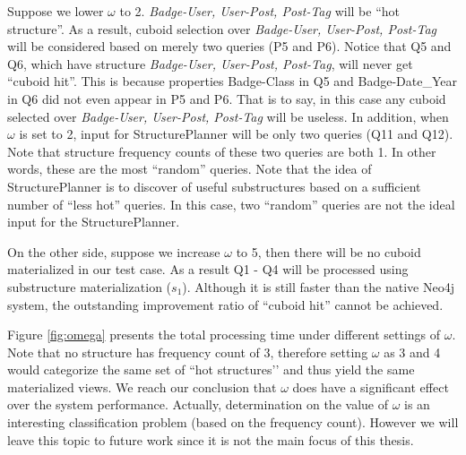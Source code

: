 	Suppose we lower $\omega$ to 2. \textit{Badge-User, User-Post, Post-Tag} will be ``hot structure''. As a result, cuboid selection over \textit{Badge-User, User-Post, Post-Tag} will be considered based on merely two queries (P5 and P6). Notice that Q5 and Q6, which have structure \textit{Badge-User, User-Post, Post-Tag}, will never get ``cuboid hit''. This is because properties Badge-Class in Q5 and Badge-Date\_Year in Q6 did not even appear in P5 and P6. That is to say, in this case any cuboid selected over \textit{Badge-User, User-Post, Post-Tag} will be useless. In addition, when $\omega$ is set to 2, input for StructurePlanner will be only two queries (Q11 and Q12). Note that structure frequency counts of these two queries are both 1. In other words, these are the most ``random'' queries. Note that the idea of StructurePlanner is to discover of useful substructures based on a sufficient number of ``less hot'' queries. In this case, two ``random'' queries are not the ideal input for the StructurePlanner.  
	
	On the other side, suppose we increase $\omega$ to 5, then there will be no cuboid materialized in our test case. As a result Q1 - Q4 will be processed using substructure materialization ($s_1$). Although it is still faster than the native Neo4j system, the outstanding improvement ratio of ``cuboid hit'' cannot be achieved. 
	
	Figure \ref{fig:omega} presents the total processing time under different settings of $\omega$. Note that no structure has frequency count of 3, therefore setting $\omega$ as 3 and 4 would categorize the same set of ``hot structures’’ and thus yield the same materialized views. We reach our conclusion that $\omega$ does have a significant effect over the system performance. Actually, determination on the value of $\omega$ is an interesting classification problem (based on the frequency count). However we will leave this topic to future work since it is not the main focus of this thesis. 
	
